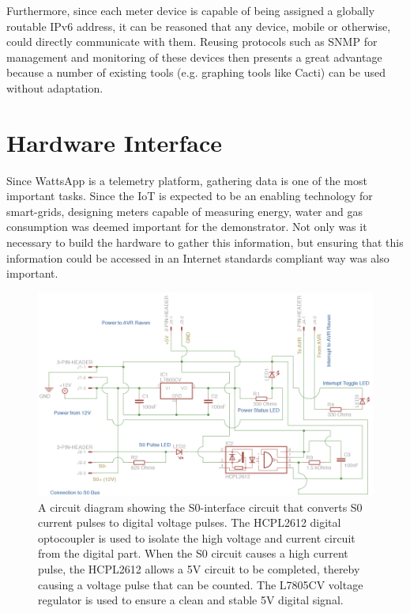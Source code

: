 \documentclass[10pt, conference, compsocconf]{IEEEtran}
\begin{document}
Furthermore, since each meter device is capable of being assigned
a globally routable IPv6 address, it can be reasoned that any device,
mobile or otherwise, could directly communicate with them. Reusing
protocols such as SNMP for management and monitoring of these devices
then presents a great advantage because a number of existing tools
(e.g. graphing tools like Cacti) can be used without adaptation.


\section{Hardware Interface}

Since WattsApp is a telemetry platform, gathering data is one of the
most important tasks. Since the IoT is expected to be an enabling
technology for smart-grids, designing meters capable of measuring
energy, water and gas consumption was deemed important for the demonstrator.
Not only was it necessary to build the hardware to gather this information,
but ensuring that this information could be accessed in an Internet
standards compliant way was also important.

\begin{figure}[t]
\begin{centering}
\includegraphics[scale=.75]{images/schematic} 
\par\end{centering}

\caption{A circuit diagram showing the S0-interface circuit that converts S0
current pulses to digital voltage pulses. The HCPL2612 digital optocoupler
is used to isolate the high voltage and current circuit from the digital
part. When the S0 circuit causes a high current pulse, the HCPL2612
allows a 5V circuit to be completed, thereby causing a voltage pulse
that can be counted. The L7805CV voltage regulator is used to ensure
a clean and stable 5V digital signal.}


\label{fig:S0-interface} 
\end{figure}
\end{document}
